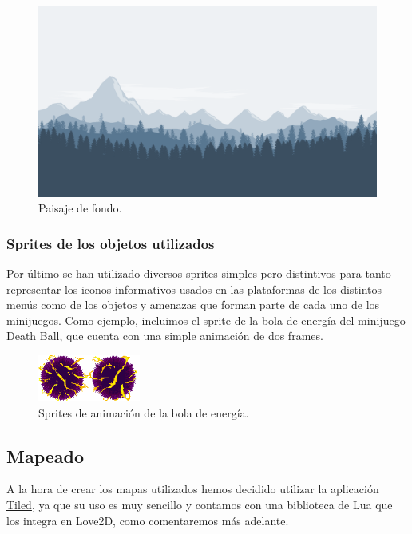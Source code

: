 \documentclass[12pt, spanish]{article}
\begin{document}
\begin{figure}[H]
	\centering
	\includegraphics[width=\textwidth]{"multimedia/landscape.png"}
	\caption{Paisaje de fondo.}\label{figure:landscape}
\end{figure}

\subsubsection{Sprites de los objetos utilizados}

Por último se han utilizado diversos sprites simples pero distintivos para tanto representar los iconos informativos usados en las plataformas de los distintos menús como de los objetos y amenazas que forman parte de cada uno de los minijuegos. Como ejemplo, incluimos el sprite de la bola de energía del minijuego Death Ball, que cuenta con una simple animación de dos frames.

\begin{figure}[H]
	\centering
	\includegraphics[width=0.3\textwidth]{"multimedia/energy_ball.png"}
	\caption{Sprites de animación de la bola de energía.}\label{figure:energy_ball}
\end{figure}

\subsection{Mapeado}

A la hora de crear los mapas utilizados hemos decidido utilizar la aplicación \href{https://www.mapeditor.org/}{Tiled}, ya que su uso es muy sencillo y contamos con una biblioteca de Lua que los integra en Love2D, como comentaremos más adelante.
\end{document}
